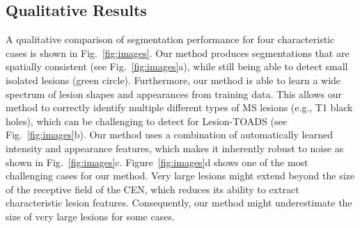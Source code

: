
\subsection{Qualitative Results}

A qualitative comparison of segmentation performance for four characteristic
cases is shown in Fig.~\ref{fig:images}. Our method produces segmentations that
are spatially consistent (see Fig.~\ref{fig:images}a), while still being able to
detect small isolated lesions (green circle). Furthermore, our method is able to
learn a wide spectrum of lesion shapes and appearances from training data. This
allows our method to correctly identify multiple different types of MS lesions
(e.g., T1 black holes), which can be challenging to detect for Lesion-TOADS (see
Fig.~\ref{fig:images}b).
Our method uses a combination of automatically learned intensity and appearance
features, which makes it inherently robust to noise as shown in
Fig.~\ref{fig:images}c. Figure~\ref{fig:images}d shows one of the most
challenging cases for our method. Very large lesions might extend beyond the
size of the receptive field of the CEN, which reduces its ability to extract
characteristic lesion features. Consequently, our method might underestimate
the size of very large lesions for some cases.

